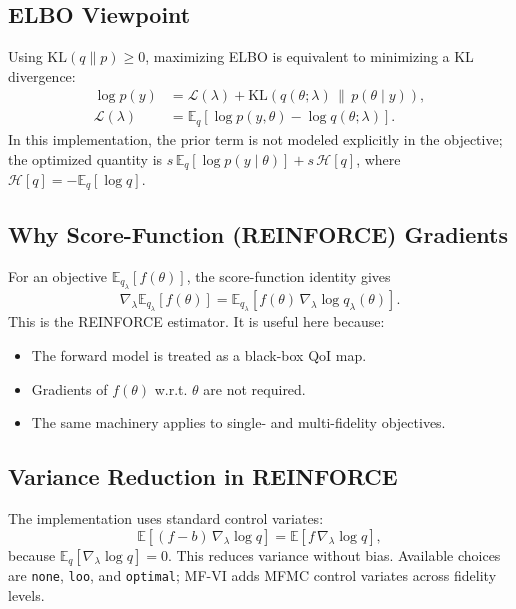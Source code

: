 \documentclass[11pt]{article}
\begin{document}
\subsection{ELBO Viewpoint}
Using \(\mathrm{KL}(q\|p)\ge 0\), maximizing ELBO is equivalent to minimizing a KL divergence:
\begin{align}
\log p(y)
&= \mathcal{L}(\lambda) + \mathrm{KL}\!\left(q(\theta;\lambda)\,\|\,p(\theta\mid y)\right),\\
\mathcal{L}(\lambda)
&= \mathbb{E}_{q}\!\left[\log p(y,\theta)-\log q(\theta;\lambda)\right].
\end{align}
In this implementation, the prior term is not modeled explicitly in the objective; the optimized quantity is
\(s\,\mathbb{E}_{q}[\log p(y\mid\theta)] + s\,\mathcal{H}[q]\), where
\(\mathcal{H}[q]=-\mathbb{E}_q[\log q]\).

\subsection{Why Score-Function (REINFORCE) Gradients}
For an objective \(\mathbb{E}_{q_\lambda}[f(\theta)]\), the score-function identity gives
\begin{equation}
\nabla_\lambda \mathbb{E}_{q_\lambda}[f(\theta)]
= \mathbb{E}_{q_\lambda}\!\left[f(\theta)\,\nabla_\lambda \log q_\lambda(\theta)\right].
\end{equation}
This is the REINFORCE estimator. It is useful here because:
\begin{itemize}
  \item The forward model is treated as a black-box QoI map.
  \item Gradients of \(f(\theta)\) w.r.t. \(\theta\) are not required.
  \item The same machinery applies to single- and multi-fidelity objectives.
\end{itemize}

\subsection{Variance Reduction in REINFORCE}
The implementation uses standard control variates:
\begin{equation}
\mathbb{E}\!\left[(f-b)\,\nabla_\lambda \log q\right]
=
\mathbb{E}\!\left[f\,\nabla_\lambda \log q\right],
\end{equation}
because \(\mathbb{E}_q[\nabla_\lambda \log q]=0\).
This reduces variance without bias.
Available choices are \texttt{none}, \texttt{loo}, and \texttt{optimal}; MF-VI adds MFMC control variates across fidelity levels.
\end{document}
